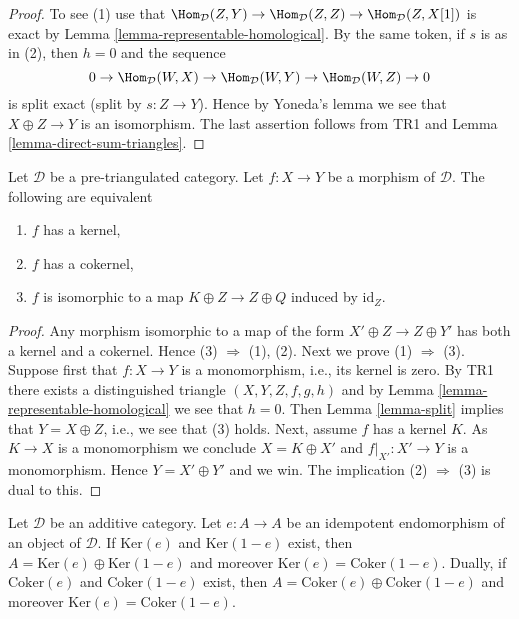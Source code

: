 \begin{proof}
To see (1) use that
$\Hom_\mathcal{D}(Z, Y) \to \Hom_\mathcal{D}(Z, Z) \to
\Hom_\mathcal{D}(Z, X[1])$
is exact by
Lemma \ref{lemma-representable-homological}.
By the same token, if $s$ is as in (2), then $h = 0$ and the sequence
$$
0 \to \Hom_\mathcal{D}(W, X) \to \Hom_\mathcal{D}(W, Y)
\to \Hom_\mathcal{D}(W, Z) \to 0
$$
is split exact (split by $s : Z \to Y$). Hence by Yoneda's lemma we
see that $X \oplus Z \to Y$ is an isomorphism. The last assertion follows
from TR1 and
Lemma \ref{lemma-direct-sum-triangles}.
\end{proof}

\begin{lemma}
\label{lemma-when-split}
Let $\mathcal{D}$ be a pre-triangulated category.
Let $f : X \to Y$ be a morphism of $\mathcal{D}$.
The following are equivalent
\begin{enumerate}
\item $f$ has a kernel,
\item $f$ has a cokernel,
\item $f$ is isomorphic to a map $K \oplus Z \to Z \oplus Q$
induced by $\text{id}_Z$.
\end{enumerate}
\end{lemma}

\begin{proof}
Any morphism isomorphic to a map of the form
$X' \oplus Z \to Z \oplus Y'$ has both a kernel and a cokernel.
Hence (3) $\Rightarrow$ (1), (2).
Next we prove (1) $\Rightarrow$ (3).
Suppose first that $f : X \to Y$ is a monomorphism, i.e., its kernel is zero.
By TR1 there exists a distinguished triangle $(X, Y, Z, f, g, h)$
and by
Lemma \ref{lemma-representable-homological}
we see that $h = 0$. Then
Lemma \ref{lemma-split}
implies that $Y = X \oplus Z$, i.e., we see that (3) holds.
Next, assume $f$ has a kernel $K$. As $K \to X$ is a monomorphism we
conclude $X = K \oplus X'$ and $f|_{X'} : X' \to Y$ is a monomorphism.
Hence $Y = X' \oplus Y'$ and we win.
The implication (2) $\Rightarrow$ (3) is dual to this.
\end{proof}

\noindent
Let $\mathcal{D}$ be an additive category. Let $e : A \to A$ be an
idempotent endomorphism of an object of $\mathcal{D}$. If $\text{Ker}(e)$
and $\text{Ker}(1 - e)$ exist, then
$A = \text{Ker}(e) \oplus \text{Ker}(1 - e)$ and moreover
$\text{Ker}(e) = \text{Coker}(1 - e)$. Dually, if
$\text{Coker}(e)$ and $\text{Coker}(1 - e)$ exist, then
$A = \text{Coker}(e) \oplus \text{Coker}(1 - e)$ and moreover
$\text{Ker}(e) = \text{Coker}(1 - e)$.

